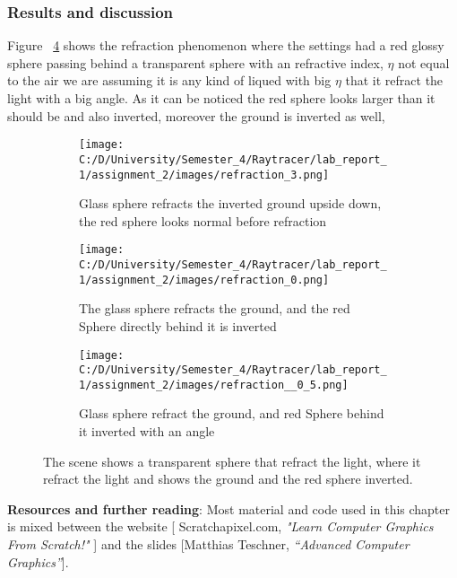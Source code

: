 \documentclass{article}
\begin{document}
	\subsubsection{Results and discussion}
	Figure ~\ref{fig:9} shows the refraction phenomenon where the settings had a red glossy sphere passing behind a transparent sphere with an refractive index, $\eta$ not equal to the air we are assuming it is any kind of liqued with big $\eta$ that it refract the light with a big angle. As it can be noticed the red sphere looks larger than it should be and also inverted, moreover the ground is inverted as well, 
	\begin{figure}[H]
		\begin{center}
			\begin{subfigure}{.3\textwidth}
				\centering
				\texttt{[image: C:/D/University/Semester\_4/Raytracer/lab\_report\_1/assignment\_2/images/refraction\_3.png]}  
				\caption{ Glass sphere refracts the inverted ground upside down, the red sphere looks normal before refraction}
				\label{fig:sub-first}
			\end{subfigure}
			\begin{subfigure}{.3\textwidth}
				\centering
				\texttt{[image: C:/D/University/Semester\_4/Raytracer/lab\_report\_1/assignment\_2/images/refraction\_0.png]}  
				\caption{The glass sphere refracts the ground, and the red Sphere directly behind it is inverted}
				\label{fig:sub-second}
			\end{subfigure}
			\begin{subfigure}{.3\textwidth}
				\centering
				\texttt{[image: C:/D/University/Semester\_4/Raytracer/lab\_report\_1/assignment\_2/images/refraction\_\_0\_5.png]}  
				\caption{ Glass sphere refract the ground, and red Sphere behind it inverted with an angle}
				\label{fig:sub-third}
			\end{subfigure}
			
			\caption{The scene shows a transparent sphere that refract the light, where it refract the light and shows the ground and the red sphere inverted.}
			\label{fig:9}
		\end{center}
	\end{figure}
	
	
	
	
	\textbf{Resources and further reading}: 
	Most material and code used in this chapter is mixed between the website [	Scratchapixel.com,	\textit{"Learn Computer Graphics From Scratch!"}
	] and the slides 		[Matthias Teschner, 	\textit{“Advanced Computer Graphics”}].
	\clearpage
\end{document}

